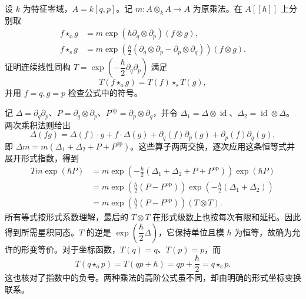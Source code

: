 \begin{optionalexercise}\label{b4:ex:ordered-symmetric-star-equivalence}
	设 \(k\) 为特征零域，\(A=k[q,p]\)。记 \(m:A\otimes_k A\to A\) 为原乘法。在 \(A[\![\hbar]\!]\) 上分别取
	\[
		\begin{aligned}
			f\star_{\mathrm o}g&=m\exp(\hbar\partial_q\otimes\partial_p)(f\otimes g),\\
			f\star_{\mathrm s}g&=m\exp\!\left(\frac{\hbar}{2}
			(\partial_q\otimes\partial_p-\partial_p\otimes\partial_q)\right)(f\otimes g).
		\end{aligned}
	\]
	证明连续线性同构 \(T=\exp(-\dfrac{\hbar}{2}\partial_q\partial_p)\) 满足
	\[
		T(f\star_{\mathrm o}g)=T(f)\star_{\mathrm s}T(g),
	\]
	并用 \(f=q,g=p\) 检查公式中的符号。
\end{optionalexercise}
\begin{solution}
	记 \(\Delta=\partial_q\partial_p\)、\(P=\partial_q\otimes\partial_p\)、\(P^{\mathrm{op}}=\partial_p\otimes\partial_q\)，并令 \(\Delta_1=\Delta\otimes\operatorname{id}\)、\(\Delta_2=\operatorname{id}\otimes\Delta\)。两次乘积法则给出
	\[
		\Delta(fg)=\Delta(f)\cdot g+f\cdot\Delta(g)
		+\partial_q(f)\partial_p(g)+\partial_p(f)\partial_q(g),
	\]
	即 \(\Delta m=m(\Delta_1+\Delta_2+P+P^{\mathrm{op}})\)。这些算子两两交换，逐次应用这条恒等式并展开形式指数，得到
	\[
		\begin{aligned}
			Tm\exp(\hbar P)
			&=m\exp\!\left(-\frac{\hbar}{2}
			(\Delta_1+\Delta_2+P+P^{\mathrm{op}})\right)\exp(\hbar P)\\
			&=m\exp\!\left(\frac{\hbar}{2}(P-P^{\mathrm{op}})\right)
			\exp\!\left(-\frac{\hbar}{2}(\Delta_1+\Delta_2)\right)\\
			&=m\exp\!\left(\frac{\hbar}{2}(P-P^{\mathrm{op}})\right)(T\otimes T).
		\end{aligned}
	\]
	所有等式按形式系数理解，最后的 \(T\otimes T\) 在形式级数上也按每次有限和延拓。因此得到所需星积同态。\(T\) 的逆是 \(\exp(\dfrac{\hbar}{2}\Delta)\)，它保持单位且模 \(\hbar\) 为恒等，故确为允许的形变等价。对于坐标函数，\(T(q)=q\)、\(T(p)=p\)，而
	\[
		T(q\star_{\mathrm o}p)=T(qp+\hbar)
		=qp+\frac{\hbar}{2}=q\star_{\mathrm s}p.
	\]
	这也核对了指数中的负号。两种乘法的高阶公式虽不同，却由明确的形式坐标变换联系。
\end{solution}

